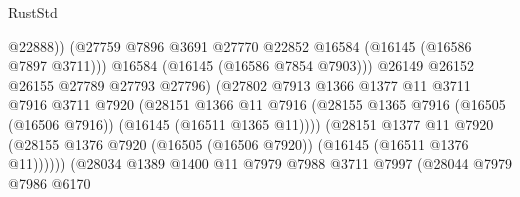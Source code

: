 \begin{lexlean}{RustStd}
\begin{coremodule}
                                            @22888))
                                        (@27759
                                          @7896
                                          @3691
                                          @27770
                                          @22852
                                          @16584
                                          (@16145 (@16586 @7897 @3711)))
                                        @16584
                                        (@16145 (@16586 @7854 @7903)))
                                      @26149
                                      @26152
                                      @26155
                                      @27789
                                      @27793
                                      @27796)
                                    (@27802
                                      @7913
                                      @1366
                                      @1377
                                      @11
                                      @3711
                                      @7916
                                      @3711
                                      @7920
                                      (@28151
                                        @1366
                                        @11
                                        @7916
                                        (@28155
                                          @1365
                                          @7916
                                          (@16505 (@16506 @7916))
                                          (@16145 (@16511 @1365 @11))))
                                      (@28151
                                        @1377
                                        @11
                                        @7920
                                        (@28155
                                          @1376
                                          @7920
                                          (@16505 (@16506 @7920))
                                          (@16145 (@16511 @1376 @11))))))
                                  (@28034
                                    @1389
                                    @1400
                                    @11
                                    @7979
                                    @7988
                                    @3711
                                    @7997
                                    (@28044
                                      @7979
                                      @7986
                                      @6170

\end{coremodule}
\end{lexlean}
